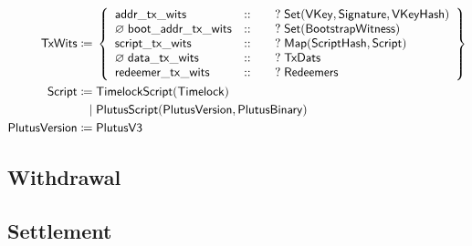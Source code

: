 \documentclass[../hydrozoa.tex]{subfiles}
\begin{document}
\begin{align*}
    \mathsf{TxWits} \coloneq\;& \left\{
    \begin{array}{lll}
      \mathsf{addr\_tx\_wits} &::& \quad?\;\mathsf{Set(VKey, Signature, VKeyHash)} \\
        \varnothing\;\mathsf{boot\_addr\_tx\_wits} &::& \quad?\;\mathsf{Set(BootstrapWitness)} \\
        \mathsf{script\_tx\_wits} &::& \quad?\;\mathsf{Map(ScriptHash, Script)} \\
        \varnothing\;\mathsf{data\_tx\_wits} &::& \quad?\;\mathsf{TxDats} \\
        \mathsf{redeemer\_tx\_wits} &::& \quad?\;\mathsf{Redeemers}
    \end{array} \right\}\\
    \mathsf{Script} \coloneq\;& \mathsf{TimelockScript}(\mathsf{Timelock}) \\
                          \mid\;& \mathsf{PlutusScript}(\mathsf{PlutusVersion},\mathsf{PlutusBinary}) \\
    \mathsf{PlutusVersion} \coloneq\;& \mathsf{PlutusV3}
\end{align*}
\endgroup

\subsection{Withdrawal}%
\label{h:ledger-withdrawal}

\subsection{Settlement}%
\label{h:ledger-settlement}
\end{document}
